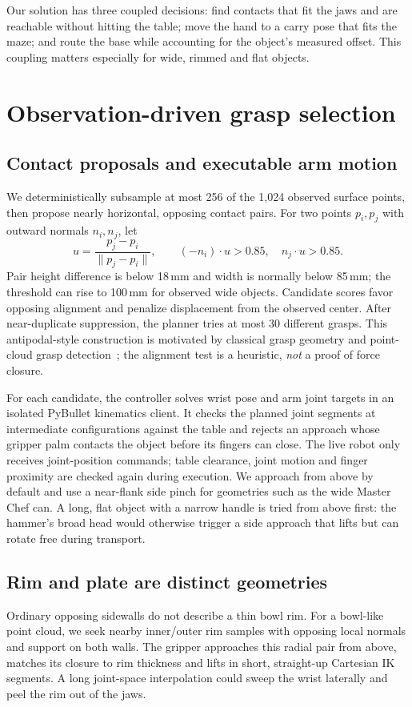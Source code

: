 \documentclass[10pt,a4paper]{article}
\begin{document}
Our solution has three coupled decisions: find contacts that fit the jaws and
are reachable without hitting the table; move the hand to a carry pose that
fits the maze; and route the base while accounting for the object's measured
offset. This coupling matters especially for wide, rimmed and flat objects.

\section{Observation-driven grasp selection}
\subsection{Contact proposals and executable arm motion}
We deterministically subsample at most 256 of the 1,024 observed surface
points, then propose nearly horizontal, opposing contact pairs. For two points
$p_i,p_j$ with outward normals $n_i,n_j$, let
\begin{equation}
 u=\frac{p_j-p_i}{\lVert p_j-p_i\rVert},\qquad
 (-n_i)\!\cdot u>0.85,\quad n_j\!\cdot u>0.85 .
 \label{eq:contacts}
\end{equation}
Pair height difference is below 18\,mm and width is normally below 85\,mm;
the threshold can rise to 100\,mm for observed wide objects. Candidate
scores favor opposing alignment and penalize displacement from the observed
center. After near-duplicate suppression, the planner tries at most 30
different grasps. This antipodal-style construction is motivated by classical
grasp geometry and point-cloud grasp detection~\cite{nguyen,tenpas}; the
alignment test is a heuristic, \emph{not} a proof of force closure.

For each candidate, the controller solves wrist pose and arm joint targets in
an isolated PyBullet kinematics client. It checks the planned joint segments
at intermediate configurations against the table and rejects an approach
whose gripper palm contacts the object before its fingers can close. The live
robot only receives joint-position commands; table clearance, joint motion
and finger proximity are checked again during execution. We approach from
above by default and use a near-flank side pinch for geometries such as the
wide Master Chef can. A long, flat object with a narrow handle is tried from
above first: the hammer's broad head would otherwise trigger a side approach
that lifts but can rotate free during transport.

\subsection{Rim and plate are distinct geometries}
Ordinary opposing sidewalls do not describe a thin bowl rim. For a bowl-like
point cloud, we seek nearby inner/outer rim samples with opposing local
normals and support on both walls. The gripper approaches this radial pair
from above, matches its closure to rim thickness and lifts in short,
straight-up Cartesian IK segments. A long joint-space interpolation could
sweep the wrist laterally and peel the rim out of the jaws.
\end{document}
